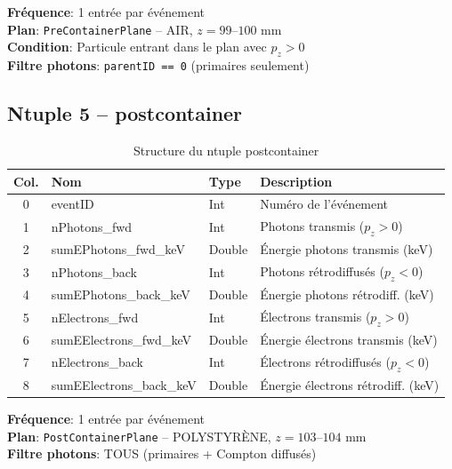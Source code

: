 \documentclass[11pt,a4paper]{article}
\begin{document}
\textbf{Fréquence}: 1 entrée par événement\\
\textbf{Plan}: \texttt{PreContainerPlane} -- AIR, $z = 99$--$100$ mm\\
\textbf{Condition}: Particule entrant dans le plan avec $p_z > 0$\\
\textbf{Filtre photons}: \texttt{parentID == 0} (primaires seulement)

\subsection{Ntuple 5 -- postcontainer}

\begin{table}[h]
\centering
\begin{tabular}{clll}
\toprule
\rowcolor{headerblue!20}
\textbf{Col.} & \textbf{Nom} & \textbf{Type} & \textbf{Description} \\
\midrule
0 & eventID & Int & Numéro de l'événement \\
\rowcolor{lightgray}
1 & nPhotons\_fwd & Int & Photons transmis ($p_z > 0$) \\
2 & sumEPhotons\_fwd\_keV & Double & Énergie photons transmis (keV) \\
\rowcolor{lightgray}
3 & nPhotons\_back & Int & Photons rétrodiffusés ($p_z < 0$) \\
4 & sumEPhotons\_back\_keV & Double & Énergie photons rétrodiff. (keV) \\
\rowcolor{lightgray}
5 & nElectrons\_fwd & Int & Électrons transmis ($p_z > 0$) \\
6 & sumEElectrons\_fwd\_keV & Double & Énergie électrons transmis (keV) \\
\rowcolor{lightgray}
7 & nElectrons\_back & Int & Électrons rétrodiffusés ($p_z < 0$) \\
8 & sumEElectrons\_back\_keV & Double & Énergie électrons rétrodiff. (keV) \\
\bottomrule
\end{tabular}
\caption{Structure du ntuple postcontainer}
\end{table}

\textbf{Fréquence}: 1 entrée par événement\\
\textbf{Plan}: \texttt{PostContainerPlane} -- POLYSTYRÈNE, $z = 103$--$104$ mm\\
\textbf{Filtre photons}: TOUS (primaires + Compton diffusés)

\end{document}
